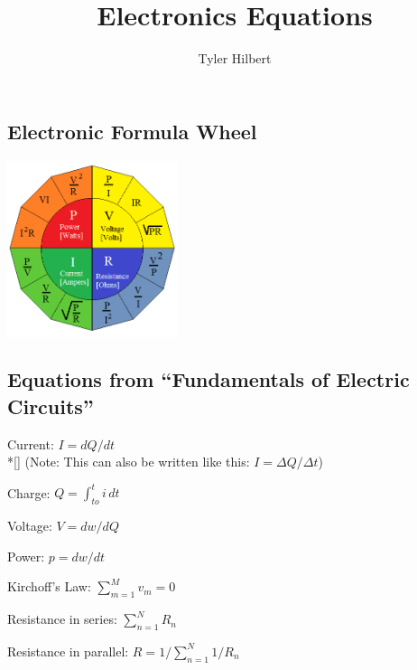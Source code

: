\documentclass{article}
\newcommand{\forceindent}{\leavevmode{\parindent=3em\indent}}
\begin{document}
	\title{Electronics Equations}
	\author{Tyler Hilbert}
	\date{}
	\maketitle

	\subsection*{Electronic Formula Wheel}
	\includegraphics[width=50mm]{FormulaWheel.png}

	\subsection*{Equations from ``Fundamentals of Electric Circuits''}

	Current: $I = dQ/dt$ \\*[\smallskipamount]
	\forceindent (Note: This can also be written like this: $I = \Delta Q / \Delta t$)
	
	Charge: $Q = \int_{to}^{t} i\,dt$

	Voltage: $V = dw/dQ$

	Power: $p = dw/dt$
	
	
	Kirchoff's Law: $\sum\limits_{m=1}^{M} v_{m} = 0$ 
	
	Resistance in series: $\sum\limits_{n=1}^{N} R_{n}$
	
	Resistance in parallel: $R = 1/\sum\limits_{n=1}^{N} 1/R_{n}$
\end{document}
